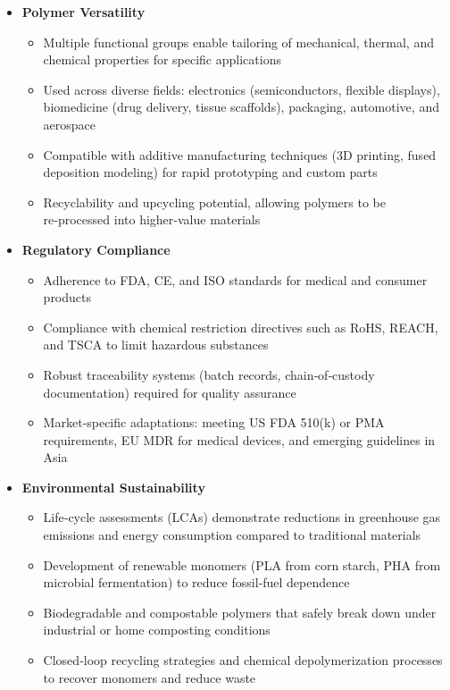 \begin{itemize}
\item \textbf{Polymer Versatility}
  \begin{itemize}
\item Multiple functional groups enable tailoring of mechanical, thermal, and chemical properties for specific applications
\item Used across diverse fields: electronics (semiconductors, flexible displays), biomedicine (drug delivery, tissue scaffolds), packaging, automotive, and aerospace
\item Compatible with additive manufacturing techniques (3D printing, fused deposition modeling) for rapid prototyping and custom parts
\item Recyclability and upcycling potential, allowing polymers to be re‑processed into higher‑value materials
  \end{itemize}
\item \textbf{Regulatory Compliance}
  \begin{itemize}
\item Adherence to FDA, CE, and ISO standards for medical and consumer products
\item Compliance with chemical restriction directives such as RoHS, REACH, and TSCA to limit hazardous substances
\item Robust traceability systems (batch records, chain‑of‑custody documentation) required for quality assurance
\item Market‑specific adaptations: meeting US FDA 510(k) or PMA requirements, EU MDR for medical devices, and emerging guidelines in Asia
  \end{itemize}
\item \textbf{Environmental Sustainability}
  \begin{itemize}
\item Life‑cycle assessments (LCAs) demonstrate reductions in greenhouse gas emissions and energy consumption compared to traditional materials
\item Development of renewable monomers (PLA from corn starch, PHA from microbial fermentation) to reduce fossil‑fuel dependence
\item Biodegradable and compostable polymers that safely break down under industrial or home composting conditions
\item Closed‑loop recycling strategies and chemical depolymerization processes to recover monomers and reduce waste
  \end{itemize}

\end{itemize}
